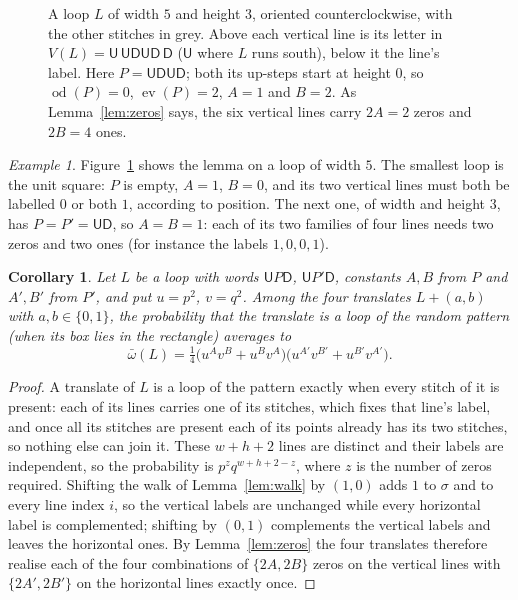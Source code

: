 \documentclass[11pt]{amsart}
\newtheorem{corollary}[theorem]{Corollary}
\theoremstyle{definition}
\theoremstyle{remark}
\newtheorem{example}[theorem]{Example}
\newcommand{\ev}{\operatorname{ev}}
\newcommand{\od}{\operatorname{od}}
\newcommand{\U}{\mathsf{U}}
\newcommand{\D}{\mathsf{D}}
\begin{document}
\begin{figure}[t]
\centering

\caption{A loop $L$ of width $5$ and height $3$, oriented counterclockwise, with the other stitches in grey. Above
each vertical line is its letter in $V(L)=\U\,\U\D\U\D\,\D$ ($\U$ where $L$ runs south), below it the line's
label. Here $P=\U\D\U\D$; both its up-steps start at height $0$, so $\od(P)=0$, $\ev(P)=2$, $A=1$ and $B=2$. As
Lemma~\ref{lem:zeros} says, the six vertical lines carry $2A=2$ zeros and $2B=4$ ones.}\label{fig:mechanism}
\end{figure}

\begin{example}
Figure~\ref{fig:mechanism} shows the lemma on a loop of width $5$. The smallest loop is the unit square: $P$ is empty, $A=1$, $B=0$, and its two vertical lines must both
be labelled $0$ or both $1$, according to position. The next one, of width and height $3$, has
$P=P'=\U\D$, so $A=B=1$: each of its two families of four lines needs two zeros and two ones (for
instance the labels $1,0,0,1$).
\end{example}

\begin{corollary}\label{cor:prob}
Let $L$ be a loop with words $\U P\D$, $\U P'\D$, constants $A,B$ from $P$ and $A',B'$ from $P'$, and
put $u=p^2$, $v=q^2$. Among the four translates $L+(a,b)$ with $a,b\in\{0,1\}$, the probability that
the translate is a loop of the random pattern (when its box lies in the rectangle) averages to
\[
\bar\omega(L)=\tfrac14\bigl(u^Av^B+u^Bv^A\bigr)\bigl(u^{A'}v^{B'}+u^{B'}v^{A'}\bigr).
\]
\end{corollary}

\begin{proof}
A translate of $L$ is a loop of the pattern exactly when every stitch of it is present: each of its
lines carries one of its stitches, which fixes that line's label, and once all its stitches are present
each of its points already has its two stitches, so nothing else can join it. These $w+h+2$ lines are
distinct and their labels are independent, so the probability is $p^{z}q^{w+h+2-z}$, where $z$ is the
number of zeros required. Shifting the walk of Lemma~\ref{lem:walk} by $(1,0)$ adds $1$ to $\sigma$
and to every line index $i$, so the vertical labels are unchanged while every horizontal label is
complemented; shifting by $(0,1)$ complements the vertical labels and leaves the horizontal ones. By
Lemma~\ref{lem:zeros} the four translates therefore realise each of the four combinations of
$\{2A,2B\}$ zeros on the vertical lines with $\{2A',2B'\}$ on the horizontal lines exactly once.
\end{proof}
\end{document}
